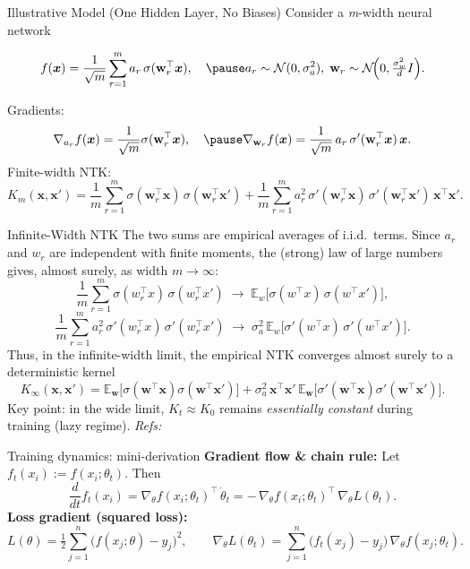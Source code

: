 \documentclass[10pt,aspectratio=169]{beamer}
\newcommand{\E}{\mathbb{E}}
\newcommand{\bx}{\boldsymbol{x}}
\begin{document}
\begin{frame}{Illustrative Model (One Hidden Layer, No Biases)}
	Consider a \textit{m}-width neural network

	\[
		f(\bx)=\frac{1}{\sqrt{m}}\sum_{r=1}^m a_r\, \sigma(\mathbf{w}_r^{\top} \bx),\quad \pause
		a_r\sim\mathcal N(0,\sigma_a^2),\;
		\mathbf{w}_r\sim\mathcal N\!\Big(0,\tfrac{\sigma_w^2}{d}I\Big).
	\]

	\pause
	Gradients:
	\[
		\nabla_{a_r} f(\bx)=\frac{1}{\sqrt{m}}\sigma(\mathbf{w}_r^{\top} \bx),\quad
		\pause
		\nabla_{\mathbf{w}_r} f(\bx)=\frac{1}{\sqrt{m}}\,a_r\,\sigma'(\mathbf{w}_r^{\top} \bx)\,\bx.
	\]
	\pause
	Finite-width NTK:
	\[
		\boxed{
		K_m(\bx,\bx')
		=\frac{1}{m}\sum_{r=1}^m \sigma(\mathbf{w}_r^{\top} \bx)\,\sigma(\mathbf{w}_r^{\top} \bx')
		+\frac{1}{m}\sum_{r=1}^m a_r^{2}\,\sigma'(\mathbf{w}_r^{\top} \bx)\,\sigma'(\mathbf{w}_r^{\top} \bx')\,\bx^{\top}\bx'.
		}
	\]
\end{frame}

\begin{frame}{Infinite-Width NTK}
	The two sums are empirical averages of i.i.d.\ terms. Since $a_r$ and $w_r$ are independent with finite moments,
	the (strong) law of large numbers gives, almost surely, as width $m\to\infty$:
	\pause
	\[
		\frac{1}{m}\sum_{r=1}^m \sigma(w_r^\top x)\,\sigma(w_r^\top x')
		\;\longrightarrow\;
		\mathbb E_{w}\big[\sigma(w^\top x)\,\sigma(w^\top x')\big],
	\]
	\pause
	\[
		\frac{1}{m}\sum_{r=1}^m a_r^2\,\sigma'(w_r^\top x)\,\sigma'(w_r^\top x')
		\;\longrightarrow\;
		\sigma_a^2\,\mathbb E_{w}\big[\sigma'(w^\top x)\,\sigma'(w^\top x')\big].
	\]
	\pause
	Thus, in the infinite-width limit, the empirical NTK converges almost surely to a deterministic kernel
	\[
		\boxed{
			K_{\infty}(\bx,\bx')=
			\E_{\mathbf{w}}\!\big[\sigma(\mathbf{w}^{\top}\bx)\sigma(\mathbf{w}^{\top}\bx')\big]
			+\sigma_a^2\,\bx^{\top}\bx'\,\E_{\mathbf{w}}\!\big[\sigma'(\mathbf{w}^{\top}\bx)\sigma'(\mathbf{w}^{\top}\bx')\big].
		}
	\]
	\pause
	Key point: in the wide limit, $K_t\approx K_0$ remains \emph{essentially constant} during training (lazy regime).
	\vspace{0.4em}
	\footnotesize \emph{Refs:} \citep{neal1996priors,lee2019wide}\normalsize
\end{frame}

\begin{frame}{Training dynamics: mini-derivation}
	\textbf{Gradient flow \& chain rule:} Let $f_t(x_i):=f(x_i;\theta_t)$. Then
	\[
		\frac{d}{dt} f_t(x_i)
		= \nabla_\theta f(x_i;\theta_t)^{\top}\,\dot{\theta}_t
		= -\,\nabla_\theta f(x_i;\theta_t)^{\top}\,\nabla_\theta L(\theta_t).
	\]
	\pause
	\textbf{Loss gradient (squared loss):}
	\[
		L(\theta)=\tfrac{1}{2}\sum_{j=1}^n \big(f(x_j;\theta)-y_j\big)^2,
		\qquad
		\nabla_\theta L(\theta_t)
		= \sum_{j=1}^n \big(f_t(x_j)-y_j\big)\,\nabla_\theta f(x_j;\theta_t).
	\]
\end{frame}
\end{document}
